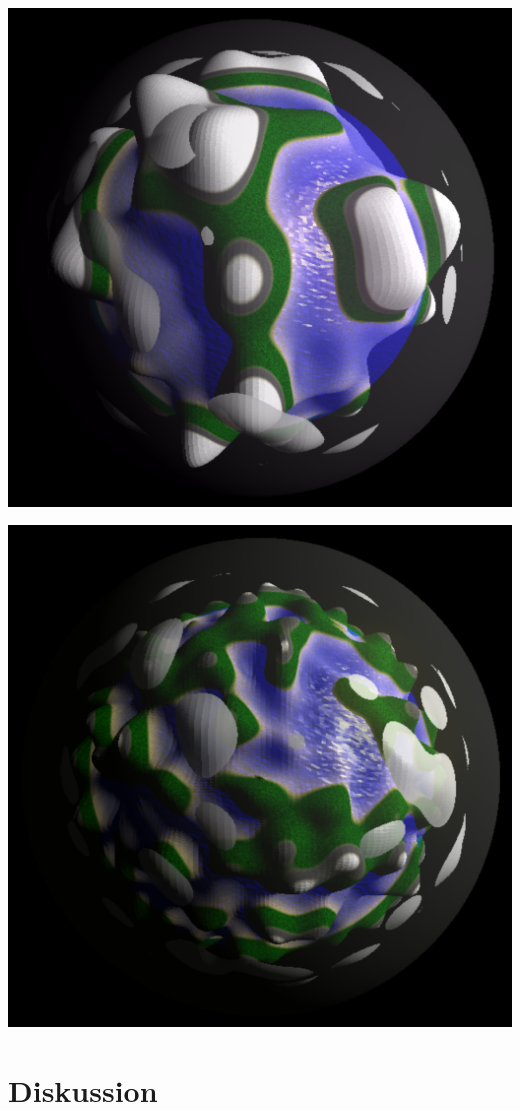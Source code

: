 \documentclass[conference]{IEEEtran}
\newenvironment{Figure}
  {\par\medskip\noindent\minipage{\linewidth}}
  {\endminipage\par\medskip}
\begin{document}
\begin{Figure}
  \centering
    \includegraphics[width=0.8\linewidth]{./images/bigger}
  \label{fig:big}
\end{Figure}

\begin{Figure}
  \centering
    \includegraphics[width=0.8\linewidth]{./images/default}
  \label{fig:default}
\end{Figure}

\section{Diskussion}
\end{document}
